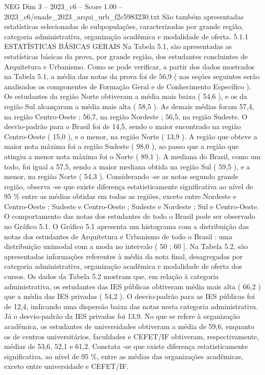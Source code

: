 \begin{textsample}{NEG Dim 3 – 2023\_c6 – Score 1.00 – 2023\_c6/enade\_2023\_arqui\_urb\_f2c5983230.txt}
São também apresentadas estatísticas selecionadas de subpopulações, caracterizadas por grande região, categoria administrativa, organização acadêmica e modalidade de oferta. 5.1.1 ESTATÍSTICAS BÁSICAS GERAIS Na Tabela 5.1, são apresentadas as estatísticas básicas da prova, por grande região, dos estudantes concluintes de Arquitetura e Urbanismo.
Como se pode verificar, a partir dos dados mostrados na Tabela 5.1, a média das notas da prova foi de 56,9 ( nas seções seguintes serão analisados os componentes de Formação Geral e de Conhecimento Específico ).
Os estudantes da região Norte obtiveram a média mais baixa ( 54,6 ), e os da região Sul alcançaram a média mais alta ( 58,5 ).
As demais médias foram 57,4, na região Centro-Oeste ; 56,7, na região Nordeste ; 56,5, na região Sudeste.
O desvio-padrão para o Brasil foi de 14,5, sendo o maior encontrado na região Centro-Oeste ( 15,0 ), e o menor, na região Norte ( 13,9 ).
A região que obteve a maior nota máxima foi a região Sudeste ( 98,0 ), ao passo que a região que atingiu a menor nota máxima foi o Norte ( 89,1 ).
A mediana do Brasil, como um todo, foi igual a 57,5, sendo a maior mediana obtida na região Sul ( 59,5 ), e a menor, na região Norte ( 54,3 ).
Considerando -se as notas segundo grande região, observa -se que existe diferença estatisticamente significativa ao nível de 95 \% entre as médias obtidas em todas as regiões, exceto entre Nordeste e Centro-Oeste ; Sudeste e Centro-Oeste ; Sudeste e Nordeste ; Sul e Centro-Oeste.
O comportamento das notas dos estudantes de todo o Brasil pode ser observado no Gráfico 5.1.
O Gráfico 5.1 apresenta um histograma com a distribuição das notas dos estudantes de Arquitetura e Urbanismo de todo o Brasil : uma distribuição unimodal com a moda no intervalo ( 50 ; 60 ].
Na Tabela 5.2, são apresentadas informações referentes à média da nota final, desagregadas por categoria administrativa, organização acadêmica e modalidade de oferta dos cursos.
Os dados da Tabela 5.2 mostram que, em relação à categoria administrativa, os estudantes das IES públicas obtiveram média mais alta ( 66,2 ) que a média das IES privadas ( 54,2 ).
O desvio-padrão para as IES públicas foi de 12,4, indicando uma dispersão baixa das notas nesta categoria administrativa.
Já o desvio-padrão da IES privadas foi 13,9.
No que se refere à organização acadêmica, os estudantes de universidades obtiveram a média de 59,6, enquanto os de centros universitários, faculdades e CEFET/IF obtiveram, respectivamente, médias de 53,6, 52,1 e 61,2.
Constata -se que existe diferença estatisticamente significativa, ao nível de 95 \%, entre as médias das organizações acadêmicas, exceto entre universidade e CEFET/IF.

\end{textsample}
